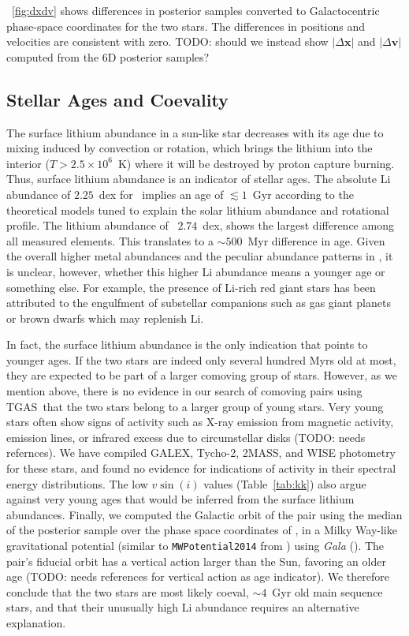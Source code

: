 \documentclass[12pt,letterpaper,margin=1in]{article}
\newcommand{\project}[1]{\textsl{#1}}
\newcommand{\acronym}[1]{{\small{#1}}}
\newcommand{\tgas}{\acronym{TGAS}}
\newcommand*\elem[1]{\ensuremath{\mathrm{#1}}}
\newcommand{\sunanalog}{\text{Krios}}
\newcommand{\bizarreone}{\text{Kronos}}
\newcommand{\todo}[1]{{TODO: #1}}
\renewcommand\tablename{Table}
\begin{document}
\figurename~\ref{fig:dxdv} shows differences in posterior samples converted to
Galactocentric phase-space coordinates for the two stars.
The differences in positions and velocities are consistent with zero.
\todo{should we instead show $|\Delta\boldsymbol{x}|$ and
$|\Delta\boldsymbol{v}|$ computed from the 6D posterior samples?}

\subsection*{Stellar Ages and Coevality}

The surface lithium abundance in a sun-like star decreases with its age due to
mixing induced by convection or rotation, which brings the lithium into the
interior ($T>2.5 \times 10^{6}$~K) where it will be destroyed by proton capture
burning.
Thus, surface lithium abundance is an indicator of stellar ages.
The absolute $\elem{Li}$ abundance of $2.25$~dex for \sunanalog\ implies an age
of $\lesssim 1$~Gyr according to the theoretical models tuned to explain the
solar lithium abundance and rotational profile\cite{2005Sci...309.2189C}.
The lithium abundance of \bizarreone\, $2.74$~dex, shows the largest difference
among all measured elements.
This translates to a $\sim 500$~Myr difference in age.
Given the overall higher metal abundances and the peculiar abundance patterns
in \bizarreone, it is unclear, however, whether this higher $\elem{Li}$
abundance means a younger age or something else.
For example, the presence of $\elem{Li}$-rich red giant stars has been
attributed to the engulfment of substellar companions such as gas giant planets
or brown dwarfs which may replenish $\elem{Li}$\cite{Casey:2016aa}.

In fact, the surface lithium abundance is the only indication that points to
younger ages.
If the two stars are indeed only several hundred Myrs old at most,
they are expected to be part of a larger comoving group of stars.
However, as we mention above, there is no evidence in our search of comoving pairs
using \tgas\ that the two stars belong to a larger group of young stars.
Very young stars often show signs of activity such as
X-ray emission from magnetic activity, emission lines, or infrared excess due to
circumstellar disks (\todo{needs refernces}).
We have compiled GALEX, Tycho-2, 2MASS, and WISE photometry for these stars,
and found no evidence for indications of activity in their spectral energy
distributions.
The low $v\sin(i)$ values (\tablename~\ref{tab:kk}) also argue against very
young ages that would be inferred from the surface lithium abundances.
Finally, we computed the Galactic orbit of the pair using the median of the
posterior sample over the phase space coordinates of \sunanalog, in a Milky
Way-like gravitational potential (similar to \texttt{MWPotential2014} from
\cite{Bovy:2015}) using \project{Gala} (\cite{gala}).
The pair's fiducial orbit has a vertical action larger than the Sun, favoring
an older age (\todo{needs references for vertical action as age indicator}).
We therefore conclude that the two stars are most likely coeval, $\sim 4$~Gyr
old main sequence stars, and that their unusually high \elem{Li} abundance
requires an alternative explanation.
\end{document}
